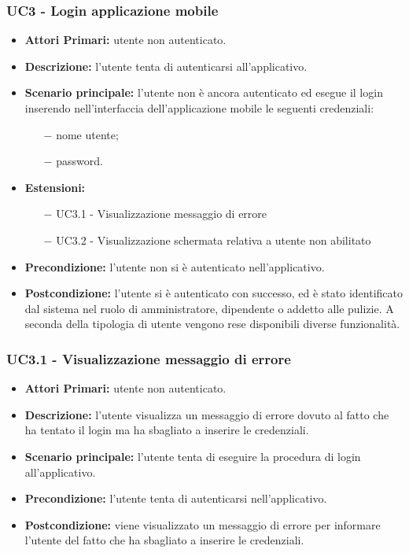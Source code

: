 \subsubsection{ UC3 - Login applicazione mobile}
\begin{itemize}
	\item\textbf{Attori Primari:} utente non autenticato.
	\item\textbf{Descrizione:} l’utente tenta di autenticarsi all'applicativo.
	\item\textbf{Scenario principale:} l’utente non è ancora autenticato ed esegue il login inserendo nell'interfaccia dell'applicazione mobile le seguenti credenziali:
	\begin{itemize}
		\item[$-$] nome utente;
		\item[$-$] password.
	\end{itemize}
	\item\textbf{Estensioni:}
	\begin{itemize}
		\item[$-$] UC3.1 - Visualizzazione messaggio di errore
		\item[$-$] UC3.2 - Visualizzazione schermata relativa a utente non abilitato
	\end{itemize}
	\item\textbf{Precondizione:} l’utente non si è autenticato nell'applicativo. 
	\item\textbf{Postcondizione:} l’utente si è autenticato con successo, ed è stato identificato dal sistema
	nel ruolo di amministratore, dipendente o addetto alle pulizie. A seconda della tipologia di utente vengono rese
	disponibili diverse funzionalità.
\end{itemize}

\subsubsection{ UC3.1 - Visualizzazione messaggio di errore}
\begin{itemize}
	\item\textbf{Attori Primari:} utente non autenticato.
	\item\textbf{Descrizione:} l'utente visualizza un messaggio di errore dovuto al fatto che ha tentato il login ma ha sbagliato a inserire le credenziali.
	\item\textbf{Scenario principale:} l’utente tenta di eseguire la procedura di login all'applicativo.
	\item\textbf{Precondizione:} l'utente tenta di autenticarsi nell'applicativo.
	\item\textbf{Postcondizione:} viene visualizzato un messaggio di errore per informare l'utente del fatto che ha sbagliato a inserire le credenziali.
\end{itemize}
